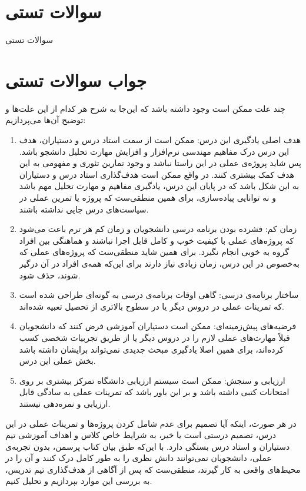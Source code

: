 \section*{سوالات تستی}

سوالات تستی
\section*{جواب سوالات تستی}

چند علت ممکن است وجود داشته باشد که این‌جا به شرح هر کدام از این علت‌ها و توضیح آن‌ها می‌پردازیم:

\begin{enumerate}
	\item هدف اصلی یادگیری این درس: ممکن است از سمت استاد درس و دستیاران، هدف این درس درک مفاهیم مهندسی نرم‌افزار و افزایش مهارت تحلیل دانشجو باشد. پس شاید پروژه‌ی عملی در این راستا نباشد و وجود تمارین تئوری و مفهومی به این هدف کمک بیشتری کنند. در واقع ممکن است هدف‌گذاری استاد درس و دستیاران به این شکل باشد که در پایان این درس، یادگیری مفاهیم و مهارت تحلیل مهم باشد و نه توانایی پیاده‌سازی، برای همین منطقی‌ست که پروژه یا تمرین عملی در سیاست‌های درس جایی نداشته باشند.
	
	\item زمان کم: فشرده بودن برنامه درسی دانشجویان و زمان کم هر ترم باعث می‌شود که پروژه‌های عملی با کیفیت خوب و کامل قابل اجرا نباشند و هماهنگی بین افراد گروه به خوبی انجام نگیرد. برای همین شاید منطقی‌ست که پروژه‌های عملی که به‌خصوص در این درس، زمان زیادی نیاز دارند برای این‌که همه‌ی افراد در آن درگیر شوند، حذف شود.
	
	\item ساختار برنامه‌ی درسی: گاهی اوقات برنامه‌ی درسی به گونه‌ای طراحی شده است که تمرینات عملی در دروس دیگر یا در سطوح بالاتری از تحصیل تعبیه شده‌اند.
	
	\item فرضیه‌های پیش‌زمینه‌ای: ممکن است دستیاران آموزشی فرض کنند که دانشجویان قبلاً مهارت‌های عملی لازم را در دروس دیگر یا از طریق تجربیات شخصی کسب کرده‌اند، برای همین اصلا یادگیری مبحث جدیدی نمی‌تواند برایشان داشته باشد بخش عملی این درس.
	
	\item ارزیابی و سنجش: ممکن است سیستم ارزیابی دانشگاه تمرکز بیشتری بر روی امتحانات کتبی داشته باشد و بر این باور باشد که تمرینات عملی به سادگی قابل ارزیابی و نمره‌دهی نیستند.
\end{enumerate}

در هر صورت، اینکه آیا تصمیم برای عدم شامل کردن پروژه‌ها و تمرینات عملی در این درس، تصمیم درستی است یا خیر، به شرایط خاص کلاس و اهداف آموزشی تیم دستیاران و استاد درس بستگی دارد. با این‌که طبق بیان کتاب پرسمن، بدون تجربه‌ی عملی، دانشجویان نمی‌توانند دانش نظری را به طور کامل درک کنند و آن را در محیط‌های واقعی به کار گیرند، منطقی‌ست که پس از آگاهی از هدف‌گذاری تیم تدریس، به بررسی این موارد بپردازیم و تحلیل کنیم.

